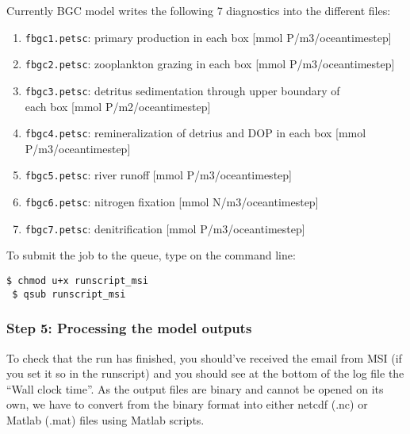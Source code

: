 \documentclass[a4paper]{article}
\def\noin{\noindent }
\begin{document}
\noin Currently BGC model writes the following 7 diagnostics into the different files:
\begin{enumerate}
\item \verb|fbgc1.petsc|: primary production in each box [mmol P/m3/oceantimestep]
\item \verb|fbgc2.petsc|: zooplankton grazing in each box [mmol P/m3/oceantimestep]
\item \verb|fbgc3.petsc|: detritus sedimentation through upper boundary of \\ each box [mmol P/m2/oceantimestep]
\item \verb|fbgc4.petsc|: remineralization of detrius and DOP in each box [mmol P/m3/oceantimestep]
\item \verb|fbgc5.petsc|: river runoff [mmol P/m3/oceantimestep]
\item \verb|fbgc6.petsc|: nitrogen fixation [mmol N/m3/oceantimestep]
\item \verb|fbgc7.petsc|: denitrification [mmol P/m3/oceantimestep]
\end{enumerate}

\noin To submit the job to the queue, type on the command line:
\begin{lstlisting}[style=DOS]
 $ chmod u+x runscript_msi
 $ qsub runscript_msi
\end{lstlisting}

\subsubsection{Step 5: Processing the model outputs}

\noin To check that the run has finished, you should've received the email from MSI (if you set it so in the runscript) and you should see at the bottom of the log file the ``Wall clock time''. As the output files are binary and cannot be opened on its own, we have to convert from the binary format into either netcdf (.nc) or Matlab (.mat) files using Matlab scripts.
\end{document}

